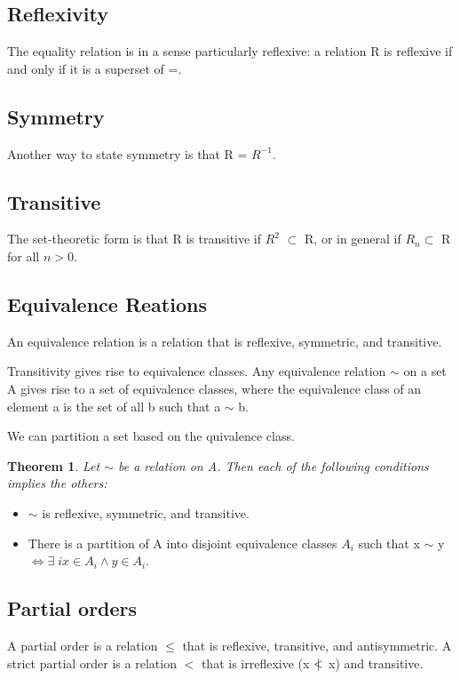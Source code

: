\documentclass[twoside]{article}
\newcounter{lecnum}
\newcommand{\nlst}{%
  \mathrel{\ooalign{$<$\cr\hidewidth$|$\hidewidth}}%
}
\renewcommand{\cite}[1]{[#1]}
\newtheorem{theorem}{Theorem}[lecnum]
\begin{document}
\subsection{Reflexivity}

The equality relation is in a sense particularly reflexive: a relation R is reflexive if and only if it is a superset of =.

\subsection{Symmetry}
Another way to state symmetry is that R = $R^{-1}$.

\subsection{Transitive}
The set-theoretic form is that R is transitive
if $R^2$ $\subset$ R, or in general if $R_n \subset$ R for all $n > 0$.

\subsection{Equivalence Reations}

An equivalence relation is a relation that is reflexive, symmetric, and transitive.

Transitivity gives rise to equivalence classes. Any equivalence relation $\sim$  on a set A gives rise to a set of equivalence classes, where the equivalence class of an element a is the set of all b such that a $\sim$  b.

We can partition a set based on the quivalence class.


\begin{theorem}
Let $\sim$ be a relation on A. Then each of the following conditions implies the others:
\end{theorem}

\begin{itemize}
\item $\sim$ is reflexive, symmetric, and transitive.
\item There is a partition of A into disjoint equivalence classes $A_i$ such that x $\sim$ y $\iff \exists \; i x \in A_i \land y \in A_i$.
\end{itemize}

\subsection{Partial orders}
A partial order is a relation $\leq$ that is reflexive, transitive, and antisymmetric. A strict partial order is a relation $<$ that is irreflexive (x $\nlst$ x) and transitive.
\end{document}

